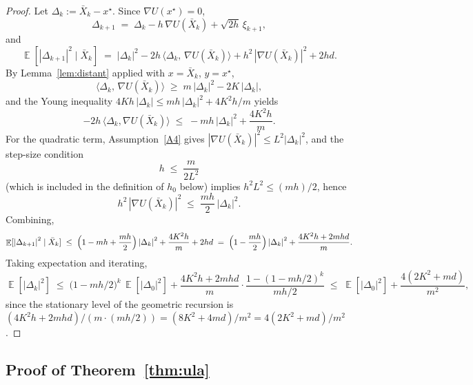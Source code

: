 \documentclass[11pt]{article}
\theoremstyle{definition}
\DeclareMathOperator{\E}{\mathbb{E}}
\newcommand{\abs}[1]{\left\lvert #1 \right\rvert}
\begin{document}
\begin{proof}
Let $\Delta_k := \bar X_k - x^\star$. Since $\nabla U(x^\star) = 0$,
\[
\Delta_{k+1} \;=\; \Delta_k - h\,\nabla U(\bar X_k) + \sqrt{2 h}\,\xi_{k+1},
\]
and
\[
\E[\abs{\Delta_{k+1}}^2 \mid \bar X_k] \;=\; \abs{\Delta_k}^2 - 2 h\,\langle \Delta_k,\,\nabla U(\bar X_k)\rangle + h^2\,\abs{\nabla U(\bar X_k)}^2 + 2 h d.
\]
By Lemma~\ref{lem:distant} applied with $x = \bar X_k$, $y = x^\star$,
\[
\langle \Delta_k,\, \nabla U(\bar X_k)\rangle \;\ge\; m\,\abs{\Delta_k}^2 - 2 K\,\abs{\Delta_k},
\]
and the Young inequality $4 K h\,\abs{\Delta_k} \le m h\,\abs{\Delta_k}^2 + 4 K^2 h/m$ yields
\[
-2 h\,\langle \Delta_k, \nabla U(\bar X_k)\rangle \;\le\; -m h\,\abs{\Delta_k}^2 + \frac{4 K^2 h}{m}.
\]
For the quadratic term, Assumption~\ref{A4} gives $\abs{\nabla U(\bar X_k)}^2 \le L^2\abs{\Delta_k}^2$, and the step-size condition
\[
h \;\le\; \frac{m}{2 L^2}
\]
(which is included in the definition of $h_0$ below) implies $h^2 L^2 \le (m h)/2$, hence
\[
h^2\,\abs{\nabla U(\bar X_k)}^2 \;\le\; \frac{m h}{2}\,\abs{\Delta_k}^2.
\]
Combining,
\[
\E[\abs{\Delta_{k+1}}^2 \mid \bar X_k] \;\le\; \Bigl(1 - m h + \frac{m h}{2}\Bigr)\abs{\Delta_k}^2 + \frac{4 K^2 h}{m} + 2 h d \;=\; \Bigl(1 - \frac{m h}{2}\Bigr)\abs{\Delta_k}^2 + \frac{4 K^2 h + 2 m h d}{m}.
\]
Taking expectation and iterating,
\[
\E[\abs{\Delta_k}^2] \;\le\; \bigl(1 - m h/2\bigr)^k\,\E[\abs{\Delta_0}^2] + \frac{4 K^2 h + 2 m h d}{m}\cdot \frac{1 - (1 - mh/2)^k}{m h/2} \;\le\; \E[\abs{\Delta_0}^2] + \frac{4(2 K^2 + m d)}{m^2},
\]
since the stationary level of the geometric recursion is $(4K^2 h + 2 m h d)/(m \cdot (m h/2)) = (8 K^2 + 4 m d)/m^2 = 4(2K^2 + m d)/m^2$.
\end{proof}

\subsection{Proof of Theorem~\ref{thm:ula}}
\end{document}
